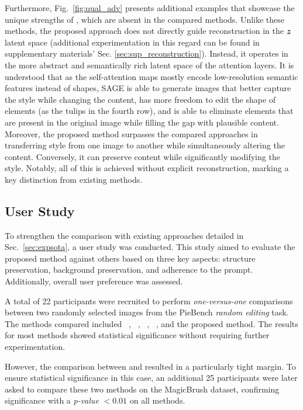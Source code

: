 Furthermore, Fig.~\ref{fig:qual_adv} presents additional examples that showcase the unique strengths of \method{}, which are absent in the compared methods. Unlike these methods, {\modified{}the proposed approach} does not directly guide reconstruction in the ${\bm{z}}$ latent space (additional experimentation in this regard can be found in supplementary materials' Sec. \ref{sec:sup_reconstruction}). Instead, it operates in the more abstract and semantically rich latent space of the attention layers. {\modified{}It is understood} that as the self-attention maps mostly encode low-resolution semantic features instead of shapes, SAGE is able to generate images that better capture the style while changing the content, has more freedom to edit the shape of elements (as the tulips in the fourth row), and is able to eliminate elements that are present in the original image while filling the gap with plausible content. Moreover, {\modified{}the proposed method} surpasses the compared approaches in transferring style from one image to another while simultaneously altering the content. Conversely, it can preserve content while significantly modifying the style. Notably, all of this is achieved without explicit reconstruction, marking a key distinction from existing methods.



\subsection{User Study}
\label{sec:userstudy}


To strengthen the comparison with existing approaches detailed in Sec.~\ref{sec:expsota}, {\modified{}a user study was conducted}. This study aimed to evaluate {\modified{}the proposed method} against others based on three key aspects: structure preservation, background preservation, and adherence to the prompt. Additionally, {\modified{}overall user preference was assessed}.

{\modified{}A total of 22 participants were recruited} to perform \textit{one-versus-one} comparisons between two randomly selected images from the PieBench \textit{random editing} task. The methods compared included \negativelong~\cite{miyake2023negative}, \directinversionlong~\cite{miyake2023negative}, \negproxlong~\cite{han2023proximal}, \ptopzerolong~\cite{parmar2023zero}, and {\modified{}the proposed method}. The results for most methods showed statistical significance without requiring further experimentation.

However, the comparison between \directinversion{} and \method{} resulted in a particularly tight margin. To ensure statistical significance in this case, an additional 25 participants were later asked to compare these two methods on the MagicBrush dataset, {\modified{}confirming} significance with a \textit{p-value} $< 0.01$ on all methods.


